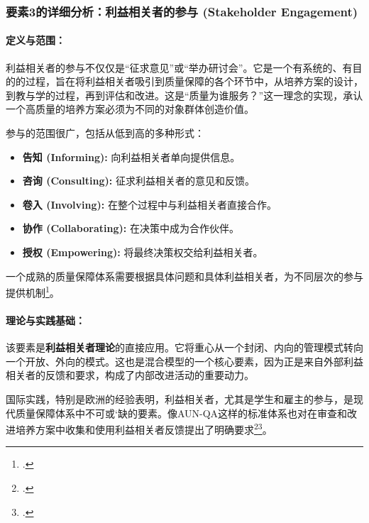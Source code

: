 \subsubsection{要素3的详细分析：利益相关者的参与 (Stakeholder Engagement)}
\label{subsubsec:thanh_to_3}

\paragraph{定义与范围：}
利益相关者的参与不仅仅是“征求意见”或“举办研讨会”。它是一个有系统的、有目的的过程，旨在将利益相关者吸引到质量保障的各个环节中，从培养方案的设计，到教与学的过程，再到评估和改进。这是“质量为谁服务？”这一理念的实现，承认一个高质量的培养方案必须为不同的对象群体创造价值。

参与的范围很广，包括从低到高的多种形式：
\begin{itemize}
    \item \textbf{告知 (Informing):} 向利益相关者单向提供信息。
    \item \textbf{咨询 (Consulting):} 征求利益相关者的意见和反馈。
    \item \textbf{卷入 (Involving):} 在整个过程中与利益相关者直接合作。
    \item \textbf{协作 (Collaborating):} 在决策中成为合作伙伴。
    \item \textbf{授权 (Empowering):} 将最终决策权交给利益相关者。
\end{itemize}
一个成熟的质量保障体系需要根据具体问题和具体利益相关者，为不同层次的参与提供机制\footcite{Arnstein1969}。

\paragraph{理论与实践基础：}
该要素是\textbf{利益相关者理论}的直接应用。它将重心从一个封闭、内向的管理模式转向一个开放、外向的模式。这也是混合模型的一个核心要素，因为正是来自外部利益相关者的反馈和要求，构成了内部改进活动的重要动力。

国际实践，特别是欧洲的经验表明，利益相关者，尤其是学生和雇主的参与，是现代质量保障体系中不可或`缺的要素。像AUN-QA这样的标准体系也对在审查和改进培养方案中收集和使用利益相关者反馈提出了明确要求\footcite{ENQA_Stakeholder2018}\footcite{AUN-QAGuide}。

